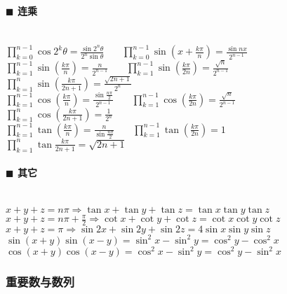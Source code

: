 \paragraph{$\blacksquare$ 连乘}
\noindent \\
${\displaystyle \prod _{{k=0}}^{{n-1}}\cos 2^{k}\theta ={\frac  {\sin 2^{n}\theta }{2^{n}\sin \theta }}}$~~~
${\displaystyle \prod _{{k=0}}^{{n-1}}\sin \left(x+{\frac  {k\pi }{n}}\right)={\frac  {\sin nx}{2^{{n-1}}}}}$\\
${\displaystyle \prod _{{k=1}}^{{n-1}}\sin \left({\frac  {k\pi }{n}}\right)={\frac  {n}{2^{{n-1}}}}}$~~~
${\displaystyle \prod _{{k=1}}^{{n-1}}\sin \left({\frac  {k\pi }{2n}}\right)={\frac  {{\sqrt  {n}}}{2^{{n-1}}}}}$~~~
${\displaystyle \prod _{{k=1}}^{{n}}\sin \left({\frac  {k\pi }{2n+1}}\right)={\frac  {{\sqrt  {2n+1}}}{2^{n}}}}$\\
${\displaystyle \prod _{{k=1}}^{{n-1}}\cos \left({\frac  {k\pi }{n}}\right)={\frac  {\sin {\frac  {n\pi }{2}}}{2^{{n-1}}}}}$~~~
${\displaystyle \prod _{{k=1}}^{{n-1}}\cos \left({\frac  {k\pi }{2n}}\right)={\frac  {{\sqrt  {n}}}{2^{{n-1}}}}}$~~~
${\displaystyle \prod _{{k=1}}^{n}\cos \left({\frac  {k\pi }{2n+1}}\right)={\frac  {1}{2^{n}}}}$\\
${\displaystyle \prod _{{k=1}}^{{n-1}}\tan \left({\frac  {k\pi }{n}}\right)={\frac  {n}{\sin {\frac  {n\pi }{2}}}}}$~~~
${\displaystyle \prod _{{k=1}}^{{n-1}}\tan \left({\frac  {k\pi }{2n}}\right)=1}$~~~
${\displaystyle \prod _{{k=1}}^{n}\tan {\frac  {k\pi }{2n+1}}={\sqrt  {2n+1}}}$\\
\paragraph{$\blacksquare$ 其它}
\noindent \\
$x+y+z=n\pi \Rightarrow \tan x+\tan y+\tan z=\tan x \tan y \tan z$\\
$x+y+z=n\pi +\frac{\pi}{2} \Rightarrow \cot x+\cot y+\cot z=\cot x \cot y \cot z$\\
$x+y+z=\pi \Rightarrow \sin 2x+\sin 2y+\sin 2z=4\sin x\sin y\sin z$\\
$\sin(x+y)\sin(x-y)=\sin ^{2}{x}-\sin ^{2}{y}=\cos ^{2}{y}-\cos ^{2}{x}$\\
$\cos(x+y)\cos(x-y)=\cos ^{2}{x}-\sin ^{2}{y}=\cos ^{2}{y}-\sin ^{2}{x}$

\subsubsection{重要数与数列}
